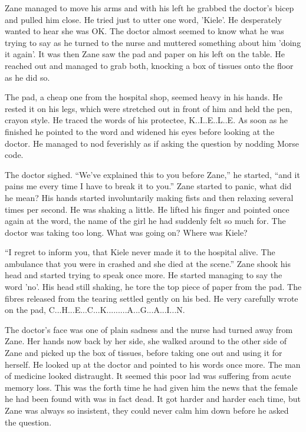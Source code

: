 Zane managed to move his arms and with his left he grabbed the doctor's bicep and pulled him close.  He tried just to utter one word, 'Kiele'.  He desperately wanted to hear she was OK.  The doctor almost seemed to know what he was trying to say as he turned to the nurse and muttered something about him 'doing it again'.  It was then Zane saw the pad and paper on his left on the table.  He reached out and managed to grab both, knocking a box of tissues onto the floor as he did so.

The pad, a cheap one from the hospital shop, seemed heavy in his hands.  He rested it on his legs, which were stretched out in front of him and held the pen, crayon style.  He traced the words of his protectee, K..I..E..L..E.  As soon as he finished he pointed to the word and widened his eyes before looking at the doctor.  He managed to nod feverishly as if asking the question by nodding Morse code.

The doctor sighed.  ``We've explained this to you before Zane,'' he started, ``and it pains me every time I have to break it to you.''  Zane started to panic, what did he mean?  His hands started involuntarily making fists and then relaxing several times per second.  He was shaking a little.  He lifted his finger and pointed once again at the word, the name of the girl he had suddenly felt so much for.  The doctor was taking too long.  What was going on?  Where was Kiele?

``I regret to inform you, that Kiele never made it to the hospital alive.  The ambulance that you were in crashed and she died at the scene.''  Zane shook his head and started trying to speak once more.  He started managing to say the word 'no'.  His head still shaking, he tore the top piece of paper from the pad.  The fibres released from the tearing settled gently on his bed.  He very carefully wrote on the pad, C...H...E...C...K.........A...G...A...I...N.

The doctor's face was one of plain sadness and the nurse had turned away from Zane.  Her hands now back by her side, she walked around to the other side of Zane and picked up the box of tissues, before taking one out and using it for herself.  He looked up at the doctor and pointed to his words once more.  The man of medicine looked distraught.  It seemed this poor lad was suffering from acute memory loss.  This was the forth time he had given him the news that the female he had been found with was in fact dead.  It got harder and harder each time, but Zane was always so insistent, they could never calm him down before he asked the question.

